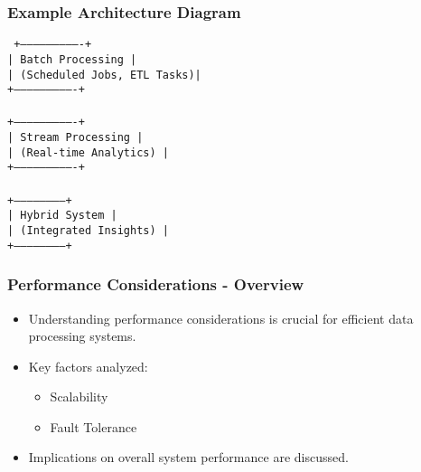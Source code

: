 \documentclass[aspectratio=169]{beamer}
\begin{document}
\begin{frame}[fragile]
    \frametitle{Example Architecture Diagram}
    \begin{center}
        \texttt{
        +----------------------------+\\
        |        Batch Processing    |\\
        | (Scheduled Jobs, ETL Tasks)|\\
        +----------------------------+\\
        \quad \quad \quad \quad \quad \quad \quad \quad \quad \quad \quad \quad\\
        +----------------------------+\\
        |      Stream Processing      |\\
        | (Real-time Analytics)      |\\
        +----------------------------+ \\
         \downarrow \\
        +-----------------------+\\
        |     Hybrid System     |\\
        | (Integrated Insights) |\\
        +-----------------------+
        }
    \end{center}
\end{frame}

\begin{frame}[fragile]
  \frametitle{Performance Considerations - Overview}
  \begin{itemize}
    \item Understanding performance considerations is crucial for efficient data processing systems.
    \item Key factors analyzed:
    \begin{itemize}
      \item Scalability
      \item Fault Tolerance
    \end{itemize}
    \item Implications on overall system performance are discussed.
  \end{itemize}
\end{frame}
\end{document}
